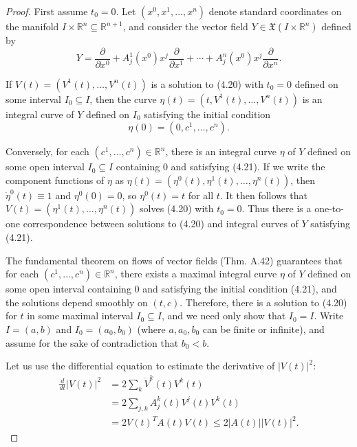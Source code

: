 \begin{proof}
First assume $t_0 = 0$. Let $(x^0, x^1, \ldots, x^n)$ denote standard coordinates on the manifold $I \times \mathbb{R}^n \subseteq \mathbb{R}^{n+1}$, and consider the vector field $Y \in \mathfrak{X}(I \times \mathbb{R}^n)$ defined by
\[
Y = \frac{\partial}{\partial x^0} + A^1_j(x^0) x^j \frac{\partial}{\partial x^1} + \cdots + A^n_j(x^0) x^j \frac{\partial}{\partial x^n}.
\]

If $V(t) = (V^1(t), \ldots, V^n(t))$ is a solution to (4.20) with $t_0 = 0$ defined on some interval $I_0 \subseteq I$, then the curve $\eta(t) = (t, V^1(t), \ldots, V^n(t))$ is an integral curve of $Y$ defined on $I_0$ satisfying the initial condition
\begin{equation}
\eta(0) = (0, c^1, \ldots, c^n).
\tag{4.21}
\end{equation}

Conversely, for each $(c^1, \ldots, c^n) \in \mathbb{R}^n$, there is an integral curve $\eta$ of $Y$ defined on some open interval $I_0 \subseteq I$ containing 0 and satisfying (4.21). If we write the component functions of $\eta$ as $\eta(t) = (\eta^0(t), \eta^1(t), \ldots, \eta^n(t))$, then $\dot{\eta}^0(t) \equiv 1$ and $\eta^0(0) = 0$, so $\eta^0(t) = t$ for all $t$. It then follows that $V(t) = (\eta^1(t), \ldots, \eta^n(t))$ solves (4.20) with $t_0 = 0$. Thus there is a one-to-one correspondence between solutions to (4.20) and integral curves of $Y$ satisfying (4.21).

The fundamental theorem on flows of vector fields (Thm. A.42) guarantees that for each $(c^1,\ldots,c^n) \in \mathbb{R}^n$, there exists a maximal integral curve $\eta$ of $Y$ defined on some open interval containing $0$ and satisfying the initial condition (4.21), and the solutions depend smoothly on $(t,c)$. Therefore, there is a solution to (4.20) for $t$ in some maximal interval $I_0 \subseteq I$, and we need only show that $I_0 = I$. Write $I = (a,b)$ and $I_0 = (a_0, b_0)$ (where $a, a_0, b_0$ can be finite or infinite), and assume for the sake of contradiction that $b_0 < b$.

Let us use the differential equation to estimate the derivative of $|V(t)|^2$:
\begin{align*}
\frac{d}{dt}|V(t)|^2 &= 2\sum_{k} \dot{V}^k(t)V^k(t)\\
&= 2\sum_{j,k} A^k_j(t)V^j(t)V^k(t)\\
&= 2V(t)^T A(t)V(t) \le 2|A(t)||V(t)|^2.
\end{align*}


\end{proof}
